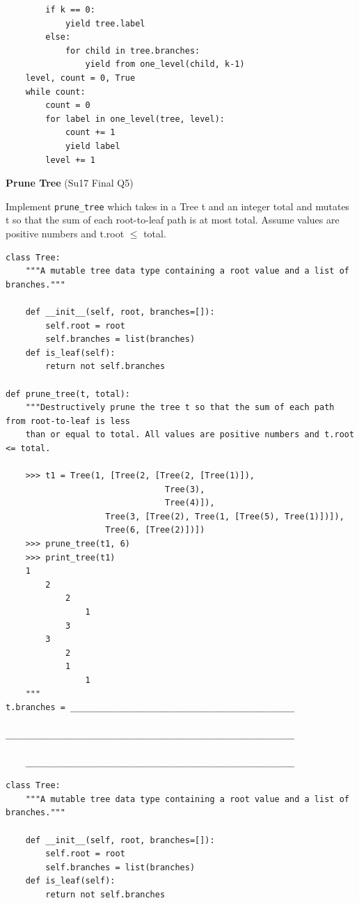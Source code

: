 \documentclass{exam}
\newlength{\currentparskip}
\newenvironment{blocksection}
{
    \setlength{\currentparskip}{\parskip}%
    \begin{minipage}{\linewidth}
    \setlength{\parskip}{\currentparskip}%
}
{
    \end{minipage}
}
\begin{document}
\begin{questions}
\begin{solution}
\begin{lstlisting}
        if k == 0:
            yield tree.label
        else:
            for child in tree.branches:
                yield from one_level(child, k-1)
    level, count = 0, True
    while count:
        count = 0
        for label in one_level(tree, level):
            count += 1
            yield label
        level += 1
\end{lstlisting}
\end{solution}

\begin{blocksection}
\question \textbf{Prune Tree} (Su17 Final Q5)

    Implement \lstinline{prune_tree} which takes in a Tree t and an integer total and mutates t so that the sum of each
    root-to-leaf path is at most total. Assume values are positive numbers and t.root $\leq$ total.
\begin{lstlisting}
class Tree:
    """A mutable tree data type containing a root value and a list of branches."""
    
    def __init__(self, root, branches=[]):
        self.root = root
        self.branches = list(branches)
    def is_leaf(self):
        return not self.branches

def prune_tree(t, total):
    """Destructively prune the tree t so that the sum of each path from root-to-leaf is less
    than or equal to total. All values are positive numbers and t.root <= total.

    >>> t1 = Tree(1, [Tree(2, [Tree(2, [Tree(1)]),
                                Tree(3),
                                Tree(4)]),
                    Tree(3, [Tree(2), Tree(1, [Tree(5), Tree(1)])]),
                    Tree(6, [Tree(2)])])
    >>> prune_tree(t1, 6)
    >>> print_tree(t1)
    1
        2
            2
                1
            3
        3
            2
            1
                1
    """
t.branches = _____________________________________________

__________________________________________________________

    ______________________________________________________
\end{lstlisting}
\end{blocksection}
\begin{solution}
\begin{lstlisting}
class Tree:
    """A mutable tree data type containing a root value and a list of branches."""
    
    def __init__(self, root, branches=[]):
        self.root = root
        self.branches = list(branches)
    def is_leaf(self):
        return not self.branches


\end{lstlisting}
\end{solution}
\end{questions}
\end{document}
